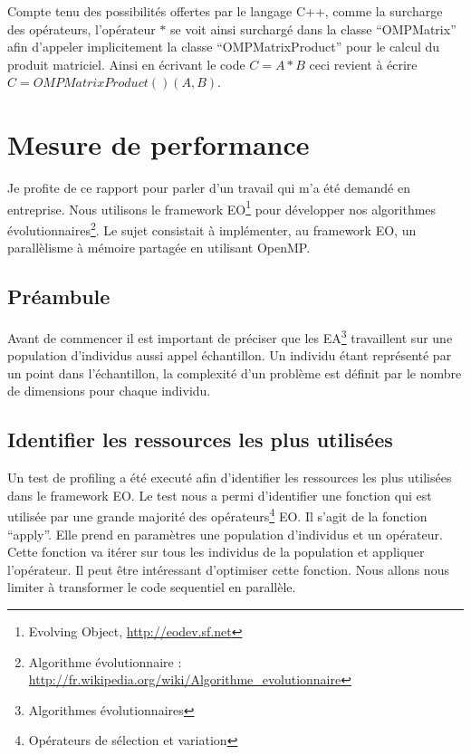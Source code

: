 \documentclass[oneside,11pt]{article}
\begin{document}
\begin{empfile}
Compte tenu des possibilités offertes par le langage C++, comme la surcharge des opérateurs, l'opérateur $*$ se voit ainsi surchargé dans la classe ``OMPMatrix'' afin d'appeler implicitement la classe ``OMPMatrixProduct'' pour le calcul du produit matriciel. Ainsi en écrivant le code $C = A * B$ ceci revient à écrire $C = OMPMatrixProduct()(A, B)$.

\newpage

\section{Mesure de performance}

Je profite de ce rapport pour parler d'un travail qui m'a été demandé en entreprise. Nous utilisons le framework EO\footnote{Evolving Object, \url{http://eodev.sf.net}} pour développer nos algorithmes évolutionnaires\footnote{Algorithme évolutionnaire : \url{http://fr.wikipedia.org/wiki/Algorithme_evolutionnaire}}. Le sujet consistait à implémenter, au framework EO, un parallèlisme à mémoire partagée en utilisant OpenMP.

\subsection{Préambule}

Avant de commencer il est important de préciser que les EA\footnote{Algorithmes évolutionnaires} travaillent sur une population d'individus aussi appel échantillon. Un individu étant représenté par un point dans l'échantillon, la complexité d'un problème est définit par le nombre de dimensions pour chaque individu.

\subsection{Identifier les ressources les plus utilisées}

Un test de profiling a été executé afin d'identifier les ressources les plus utilisées dans le framework EO. Le test nous a permi d'identifier une fonction qui est utilisée par une grande majorité des opérateurs\footnote{Opérateurs de sélection et variation} EO. Il s'agit de la fonction ``apply''. Elle prend en paramètres une population d'individus et un opérateur. Cette fonction va itérer sur tous les individus de la population et appliquer l'opérateur. Il peut être intéressant d'optimiser cette fonction. Nous allons nous limiter à transformer le code sequentiel en parallèle.


\end{empfile}
\end{document}
